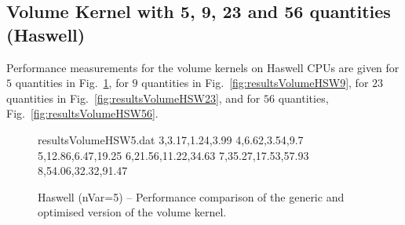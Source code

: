 \documentclass{acm_proc_article-sp}
\begin{document}
\subsection{Volume Kernel with 5, 9, 23 and 56 quantities (Haswell)} \label{sec:app1}

Performance measurements for the volume kernels on Haswell CPUs are given for $5$ quantities in Fig.~\ref{fig:resultsVolumeHSW5}, for $9$ quantities in Fig.~\ref{fig:resultsVolumeHSW9}, for $23$ quantities in Fig.~\ref{fig:resultsVolumeHSW23}, and for $56$ quantities, Fig.~\ref{fig:resultsVolumeHSW56}.

\begin{figure}[H]
\begin{filecontents}{resultsVolumeHSW5.dat}
3,3.17,1.24,3.99
4,6.62,3.54,9.7
5,12.86,6.47,19.25
6,21.56,11.22,34.63
7,35.27,17.53,57.93
8,54.06,32.32,91.47
\end{filecontents}
\caption{Haswell (nVar=5) -- Performance comparison of the generic and optimised version of the volume kernel.}\label{fig:resultsVolumeHSW5}
\end{figure}

~

~

~

~

~

~

~
\end{document}
